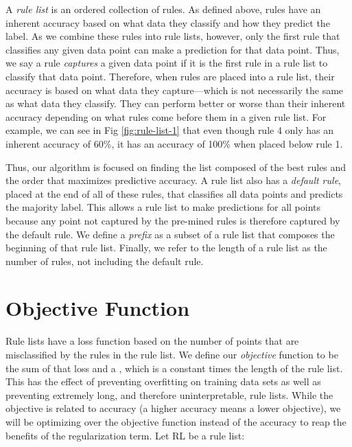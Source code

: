 A \textit{rule list} is an ordered collection of rules.
As defined above, rules have an inherent accuracy based on what data they classify and how they predict the label.
As we combine these rules into rule lists, however, only the first rule that classifies any given data point can make a prediction for that data point.
Thus, we say a rule \textit{captures} a given data point if it is the first rule in a rule list to classify that data point.
Therefore, when rules are placed into a rule list, their accuracy is based on what data they capture---which is not necessarily the same as what data they classify.
They can perform better or worse than their inherent accuracy depending on what rules come before them in a given rule list.
For example, we can see in Fig \ref{fig:rule-list-1} that even though rule 4 only has an inherent accuracy of 60\%, it has an accuracy of 100\% when placed below rule 1.

Thus, our algorithm is focused on finding the list composed of the best rules and the order that maximizes predictive accuracy.
A rule list also has a \textit{default rule}, placed at the end of all of these rules, that classifies all data points and predicts the majority label.
This allows a rule list to make predictions for all points because any point not captured by the pre-mined rules is therefore captured by the default rule.
We define a \textit{prefix} as a subset of a rule list that composes the beginning of that rule list.
Finally, we refer to the length of a rule list as the number of rules, not including the default rule.

\section{Objective Function}
Rule lists have a loss function based on the number of points that are misclassified by the rules in the rule list.
We define our \textit{objective} function to be the sum of that loss and a , which is a constant times the length of the rule list.
This has the effect of preventing overfitting on training data sets as well as preventing extremely long, and therefore uninterpretable, rule lists.
While the objective is related to accuracy (a higher accuracy means a lower objective), we will be optimizing over the objective function instead of the accuracy to reap the benefits of the regularization term.
Let RL be a rule list:

